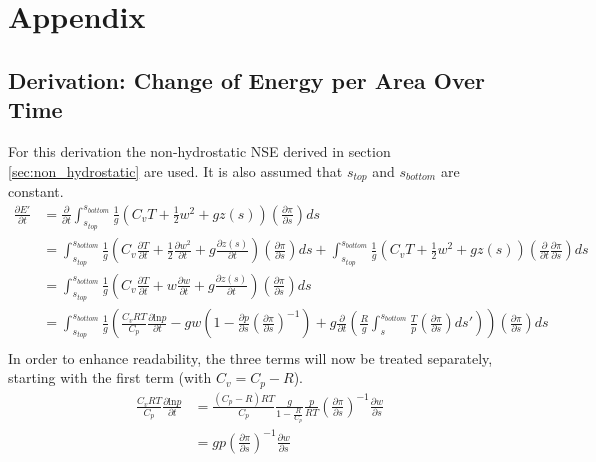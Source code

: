 \chapter{Appendix}
\section{Derivation: Change of Energy per Area Over Time}\label{sec:derivation:dE_dt}
For this derivation the non-hydrostatic NSE derived in section \ref{sec:non_hydrostatic} are used.
It is also assumed that $s_{top}$ and $s_{bottom}$ are constant.\\
\begin{align*}
\frac{\partial E'}{\partial t} &= \frac{\partial}{\partial t}\int_{s_{top}}^{s_{bottom}} \frac{1}{g}(C_vT+\frac{1}{2}w^2 + gz(s)) \left( \frac{\partial \pi}{\partial s} \right) ds\\
&= \int_{s_{top}}^{s_{bottom}} \frac{1}{g}\left(C_v\frac{\partial T}{\partial t}+\frac{1}{2}\frac{\partial w^2}{\partial t} + g\frac{\partial z(s)}{\partial t}\right) \left( \frac{\partial \pi}{\partial s} \right) ds + \int_{s_{top}}^{s_{bottom}} \frac{1}{g}(C_vT+\frac{1}{2}w^2 + gz(s)) \left( \frac{\partial}{\partial t}\frac{\partial \pi}{\partial s} \right) ds\\
&= \int_{s_{top}}^{s_{bottom}} \frac{1}{g}\left(C_v\frac{\partial T}{\partial t}+w\frac{\partial w}{\partial t} + g\frac{\partial z(s)}{\partial t}\right) \left( \frac{\partial \pi}{\partial s} \right) ds\\
&= \int_{s_{top}}^{s_{bottom}} \frac{1}{g}\left(\frac{C_vRT}{C_p}\frac{\partial \text{ln}p}{\partial t}-gw\left(1 - \frac{\partial p}{\partial s}\left(\frac{\partial \pi}{\partial s}\right)^{-1}\right) + g\frac{\partial}{\partial t}\left(\frac{R}{g}\int _s ^{s_{bottom}} \frac{T}{p}\left(\frac{\partial \pi}{\partial s}\right)ds'\right)\right) \left( \frac{\partial \pi}{\partial s} \right) ds\\
\end{align*}
In order to enhance readability, the three terms will now be treated separately, starting with the first term (with $C_v=C_p-R$).
\begin{align*}
\frac{C_vRT}{C_p}\frac{\partial \text{ln}p}{\partial t} &= \frac{(C_p-R)RT}{C_p}\frac{g}{1- \frac{R}{C_p}} \frac{p}{RT}\left(\frac{\partial \pi}{\partial s}\right)^{-1} \frac{\partial w}{\partial s}\\
&= gp\left(\frac{\partial \pi}{\partial s}\right)^{-1} \frac{\partial w}{\partial s}
\end{align*}
